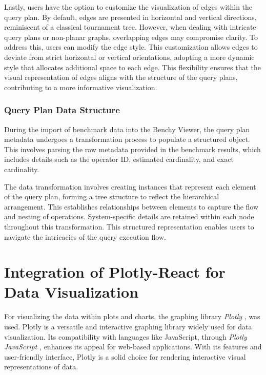Lastly, users have the option to customize the visualization of edges within the query plan. By default, edges are presented in horizontal and vertical directions, reminiscent of a classical tournament tree. However, when dealing with intricate query plans or non-planar graphs, overlapping edges may compromise clarity. To address this, users can modify the edge style. This customization allows edges to deviate from strict horizontal or vertical orientations, adopting a more dynamic style that allocates additional space to each edge. This flexibility ensures that the visual representation of edges aligns with the structure of the query plans, contributing to a more informative visualization.



\subsubsection{Query Plan Data Structure}\label{sec:query-plan-structure}

During the import of benchmark data into the Benchy Viewer, the query plan metadata undergoes a transformation process to populate a structured object. This involves parsing the raw metadata provided in the benchmark results, which includes details such as the operator ID, estimated cardinality, and exact cardinality.

The data transformation involves creating instances that represent each element of the query plan, forming a tree structure to reflect the hierarchical arrangement. This establishes relationships between elements to capture the flow and nesting of operations. System-specific details are retained within each node throughout this transformation. This structured representation enables users to navigate the intricacies of the query execution flow.








\section{Integration of Plotly-React for Data Visualization}
For visualizing the data within plots and charts, the graphing library \textit{Plotly} \parencite{plotly}, was used. Plotly is a versatile and interactive graphing library widely used for data visualization. Its compatibility with languages like JavaScript, through \textit{Plotly JavaScript} \parencite{plotly-js}, enhances its appeal for web-based applications. With its features and user-friendly interface, Plotly is a solid choice for rendering interactive visual representations of data.

